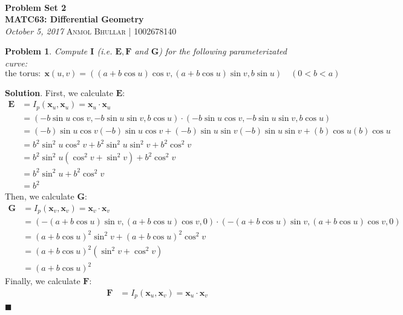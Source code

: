 \documentclass[12pt]{article}
\renewcommand{\=}[1]{\stackrel{#1}{=}} %
\newtheorem{p}{Problem}[section]
\theoremstyle{definition}
\newenvironment{s}{%
        \begin{trivlist} \item \textbf{Solution}. }{%
            \hspace*{\fill} $\blacksquare$\end{trivlist}}%
\begin{document}
{\noindent\Huge\bf  \\[0.5\baselineskip] {\selectfont  %
Problem Set 2}         }\\[2\baselineskip] %
{ {\bf {}\selectfont MATC63: Differential Geometry}\\ {\textit{%
\selectfont October 5, 2017}}}
{\large \textsc{Anmol Bhullar | 1002678140}} %
\\[1.4\baselineskip]

\begin{p}
    Compute $\mathbf{I}$ (i.e. $\mathbf{E},\mathbf{F}$ and $\mathbf{G}$) for the following parameterizated curve:
    \[ \text{the torus:}\:\:\mathbf{x}(u,v) = ((a+b\cos{u})\cos{v},(a+b\cos{u})\sin{v},b\sin{u})\quad (0 < b < a) \]
\end{p}
\begin{s}
    First, we calculate $\mathbf{E}$:
    \begin{align*}
        \mathbf{E} &= I_p(\mathbf{x}_u,\mathbf{x}_u) = \mathbf{x}_u\cdot\mathbf{x}_u \\
        &= (-b\sin{u}\cos{v},-b\sin{u}\sin{v},b\cos{u})\cdot(-b\sin{u}\cos{v},-b\sin{u}\sin{v},b\cos{u}) \\
        &= (-b)\sin{u}\cos{v}(-b)\sin{u}\cos{v} + (-b)\sin{u}\sin{v}(-b)\sin{u}\sin{v} + (b)\cos{u}(b)\cos{u} \\
        &= b^2\sin^2{u}\cos^2{v} + b^2\sin^2{u}\sin^2{v} + b^2\cos^2{v} \\
        &= b^2\sin^2{u}(\cos^2{v}+\sin^2{v}) + b^2\cos^2{v} \\
        &= b^2\sin^2{u} + b^2\cos^2{v} \\
        &= b^2
    \end{align*}
    Then, we calculate $\mathbf{G}$:
    \begin{align*}
        \mathbf{G} &= I_p(\mathbf{x}_v,\mathbf{x}_v) = \mathbf{x}_v\cdot\mathbf{x}_v \\
        &= (-(a+b\cos{u})\sin{v},(a+b\cos{u})\cos{v},0)\cdot(-(a+b\cos{u})\sin{v},(a+b\cos{u})\cos{v},0) \\
        &= (a+b\cos{u})^2\sin^2{v} + (a+b\cos{u})^2\cos^2{v} \\
        &= (a+b\cos{u})^2(\sin^2{v} + \cos^2{v}) \\
        &= (a+b\cos{u})^2
    \end{align*}
    Finally, we calculate $\mathbf{F}$:
    \begin{align*}
        \mathbf{F} &= I_p(\mathbf{x}_u,\mathbf{x}_v) = \mathbf{x}_u\cdot\mathbf{x}_v \\

\end{align*}
\end{s}
\end{document}
